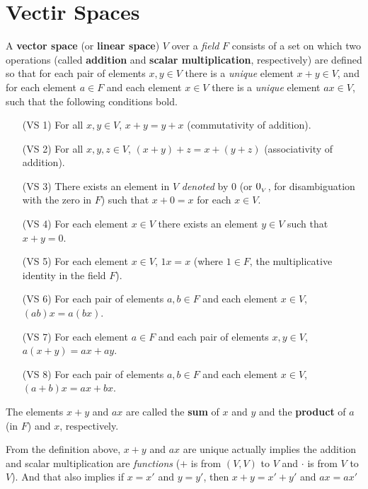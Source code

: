 \section{Vectir Spaces} \label{sec 1.2}

\begin{definition} \label{def 1.1}
A \textbf{vector space} (or \textbf{linear space}) \(V\) over a \emph{field} \(F\) consists of a set on which two operations (called \textbf{addition} and \textbf{scalar multiplication}, respectively) are defined
so that for each pair of elements \(x, y \in V\) there is a \emph{unique} element \(x + y \in V\),
and for each element \(a \in F\) and each element \(x \in V\) there is a \emph{unique} element \(ax \in V\), such that the following conditions bold.
\begin{itemize}
    \item[(VS 1)] For all \(x, y \in V\), \(x + y = y + x\) (commutativity of addition).
    \item[(VS 2)] For all \(x, y, z \in V\), \((x + y) + z = x + (y + z)\) (associativity of addition).
    \item[(VS 3)] There exists an element in \(V\) \emph{denoted} by \(0\) (or \(0_{_V}\), for disambiguation with the zero in \(F\)) such that \(x + 0 = x\) for each \(x \in V\).
    \item[(VS 4)] For each element \(x \in V\) there exists an element \(y \in V\) such that \(x + y = 0\).
    \item[(VS 5)] For each element \(x \in V\), \(1 x = x\) (where \(1 \in F\), the multiplicative identity in the field \(F\)).
    \item[(VS 6)] For each pair of elements \(a, b \in F\) and each element \(x \in V\), \((ab)x = a(bx)\).
    \item[(VS 7)] For each element \(a \in F\) and each pair of elements \(x, y \in V\), \(a(x + y) = ax + ay\).
    \item[(VS 8)] For each pair of elements \(a, b \in F\) and each element \(x \in V\), \((a + b)x = ax+ bx\).
\end{itemize}
The elements \(x + y\) and \(ax\) are called the \textbf{sum} of \(x\) and \(y\) and the \textbf{product} of \(a\) (in \(F\)) and \(x\), respectively.
\end{definition}

\begin{remark}
From the definition above, \(x + y\) and \(ax\) are unique actually implies the addition and scalar multiplication are \emph{functions} (\(+\) is from \((V, V)\) to \(V\) and \(\cdot\) is from \(V\) to \(V\)).
And that also implies if \(x = x'\) and \(y = y'\), then \(x + y = x' + y'\) and \(ax = ax'\)
\end{remark}

